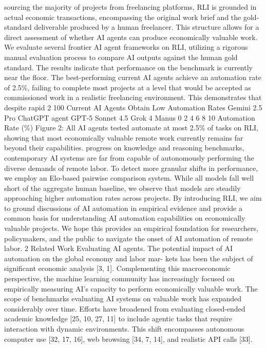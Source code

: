 sourcing the majority of projects from freelancing platforms, RLI is grounded in actual economic
transactions, encompassing the original work brief and the gold-standard deliverable produced by a
human freelancer. This structure allows for a direct assessment of whether AI agents can produce
economically valuable work.
We evaluate several frontier AI agent frameworks on RLI, utilizing a rigorous manual evaluation
process to compare AI outputs against the human gold standard. The results indicate that performance
on the benchmark is currently near the floor. The best-performing current AI agents achieve an
automation rate of 2.5\%, failing to complete most projects at a level that would be accepted as
commissioned work in a realistic freelancing environment. This demonstrates that despite rapid
2
100
Current AI Agents Obtain Low Automation Rates
Gemini
2.5 Pro
ChatGPT
agent
GPT-5
Sonnet 4.5
Grok 4
Manus
0
2
4
6
8
10
Automation Rate (\%)
Figure 2: All AI agents tested automate at most 2.5\% of tasks on RLI, showing that most economically
valuable remote work currently remains far beyond their capabilities.
progress on knowledge and reasoning benchmarks, contemporary AI systems are far from capable of
autonomously performing the diverse demands of remote labor. To detect more granular shifts in
performance, we employ an Elo-based pairwise comparison system. While all models fall well short
of the aggregate human baseline, we observe that models are steadily approaching higher automation
rates across projects.
By introducing RLI, we aim to ground discussions of AI automation in empirical evidence and
provide a common basis for understanding AI automation capabilities on economically valuable
projects. We hope this provides an empirical foundation for researchers, policymakers, and the public
to navigate the onset of AI automation of remote labor.
2
Related Work
Evaluating AI agents.
The potential impact of AI automation on the global economy and labor mar-
kets has been the subject of significant economic analysis [3, 1]. Complementing this macroeconomic
perspective, the machine learning community has increasingly focused on empirically measuring AI’s
capacity to perform economically valuable work. The scope of benchmarks evaluating AI systems
on valuable work has expanded considerably over time. Efforts have broadened from evaluating
closed-ended academic knowledge [25, 10, 27, 11] to include agentic tasks that require interaction
with dynamic environments. This shift encompasses autonomous computer use [32, 17, 16], web
browsing [34, 7, 14], and realistic API calls [33].
